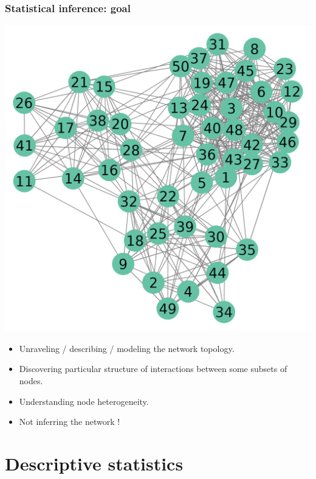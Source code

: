 \documentclass[compress,10pt]{beamer}
\begin{document}
\begin{frame}\frametitle{Statistical inference: goal}

 
 
\begin{center}
 \includegraphics[scale=.45]{plots/network_raw.png}
\end{center}

\begin{itemize}
 \item Unraveling / describing / modeling the network topology. 
 \item Discovering particular structure of interactions between some subsets of nodes.
 \item Understanding node heterogeneity.
 \item Not inferring the network !
 \end{itemize}


\end{frame}




\section{Descriptive statistics}
\end{document}
